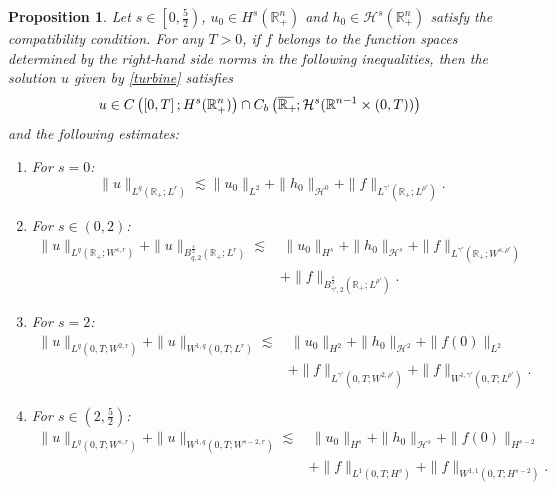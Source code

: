 \documentclass[preprint,compress,12pt]{elsarticle}
\newtheorem{proposition}[theorem]{Proposition}
\numberwithin{equation}{section}
\begin{document}
\begin{proposition}\label{abss}
	Let $s\in \left[0,\frac{5}{2}\right)$, $u_{0}\in H^{s}(\mathbb{R}_{+}^{n})$ and $h_{0}\in\mathcal{H}^{s}(\mathbb{R}_{+}^{n})$ satisfy the compatibility condition. For any $T>0$, if $f$ belongs to the function spaces determined by the right-hand side norms in the following inequalities, then the solution $u$ given by \eqref{turbine} satisfies
	\begin{equation}\label{lo}
		u\in C\left(\left[0,T\right];H^{s}(\mathbb{R}^{n}_{+})\right)\cap C_{b}\left(\overline{\mathbb{R}_{+}\mkern-4mu}\,;\mathcal{H}^{s}(\mathbb{R}^{n-1}\times(0,T))\right)
	\end{equation}
	and the following estimates:
	\begin{enumerate}[label=(\arabic*)]
		\item For $s=0$:
		\begin{equation}\label{intimate}
			\|u\|_{L^{q}(\mathbb{R}_{+};L^{r})}\lesssim \|u_{0}\|_{L^{2}}+\|h_{0}\|_{\mathcal{H}^{0}}+ \|f\|_{L^{\gamma'}(\mathbb{R}_{+};L^{\rho'})}.
		\end{equation}
		\item For $s\in (0,2)$:
		\begin{equation}\label{confine}
			\begin{aligned}
				\|u\|_{L^{q}(\mathbb{R}_{+};W^{s,r})} +\|u\|_{B^{\frac{s}{2}}_{q,2} (\mathbb{R}_{+}; L^{r} )}
				\lesssim &\, \|u_{0}\|_{H^{s}}+\|h_{0}\|_{\mathcal{H}^{s}}+ \|f\|_{L^{\gamma'} (\mathbb{R}_{+};  W^{s,\rho'})}\\
				&+\|f\|_{B^{\frac{s}{2}}_{\gamma',2} (\mathbb{R}_{+}; L^{\rho'})}.
			\end{aligned}
		\end{equation}
		\item For $s=2$:
		\begin{equation}\label{dilute}
			\begin{aligned}
				\|u\|_{L^{q}(0,T;W^{2,r})}+\|u\|_{W^{1,q}(0,T;L^{r})}
				\lesssim &\, \|u_{0}\|_{H^{2}}+\|h_{0}\|_{\mathcal{H}^{2}}+\|f(0)\|_{L^{2}}\\
				&+\|f\|_{L^{\gamma'}(0,T;W^{2,\rho'})}+\|f\|_{W^{1,\gamma'}(0,T;L^{\rho'})}.
			\end{aligned}
		\end{equation}
		\item For $s\in \left(2,\frac{5}{2}\right)$:
		\begin{equation}\label{ratify}
			\begin{aligned}
				\|u\|_{L^{q}(0,T;W^{s,r})}+\|u\|_{W^{1,q}(0,T;W^{s-2,r})}
				\lesssim &\, \|u_{0}\|_{H^{s}}+\|h_{0}\|_{\mathcal{H}^{s}}+\|f(0)\|_{H^{s-2}}\\
				&+\|f\|_{L^{1}(0,T;H^{s})}+\|f\|_{W^{1,1}(0,T;H^{s-2})}.
			\end{aligned}
		\end{equation}
	\end{enumerate}
\end{proposition}
\end{document}
